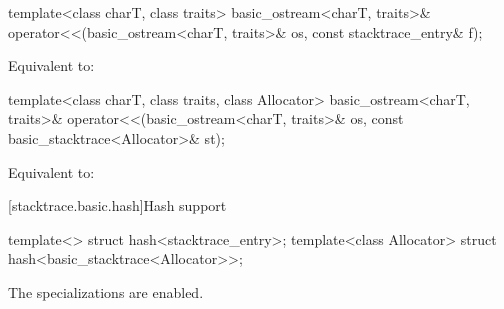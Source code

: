 %
\begin{itemdecl}
template<class charT, class traits>
basic_ostream<charT, traits>&
  operator<<(basic_ostream<charT, traits>& os, const stacktrace_entry& f);
\end{itemdecl}

\begin{itemdescr}
\pnum
\effects
Equivalent to: 
\end{itemdescr}

%
\begin{itemdecl}
template<class charT, class traits, class Allocator>
basic_ostream<charT, traits>&
  operator<<(basic_ostream<charT, traits>& os, const basic_stacktrace<Allocator>& st);
\end{itemdecl}

\begin{itemdescr}
\pnum
\effects
Equivalent to: 
\end{itemdescr}

[stacktrace.basic.hash]{Hash support}

\begin{itemdecl}
template<> struct hash<stacktrace_entry>;
template<class Allocator> struct hash<basic_stacktrace<Allocator>>;
\end{itemdecl}

\begin{itemdescr}
\pnum
The specializations are enabled.
\end{itemdescr}
